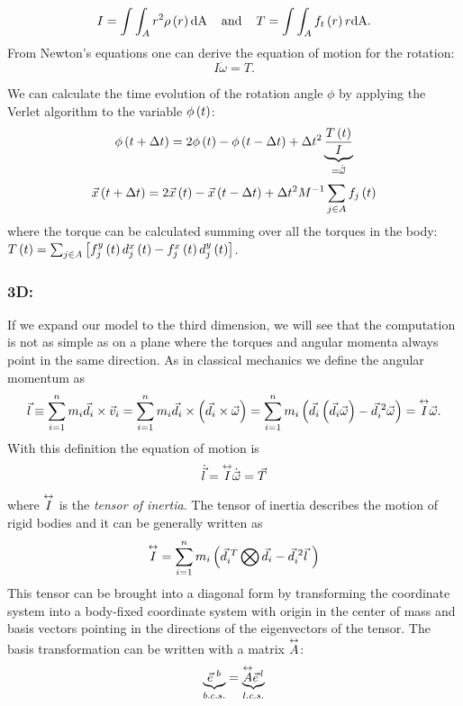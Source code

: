 $$
I = \int\int_{A}{r^2 \rho \left(r\right) \text{dA}}
\hspace{0.4cm}\text{and}\hspace{0.4cm} 
T = \int\int_{A}{f_t\left(r\right) r \text{dA}}.
\label{eq:cof_eom}
$$
From Newton's equations one can derive the equation of motion for the rotation:
\begin{equation}
I\dot{\omega} = T.
\label{eq:eom_rot}
\end{equation}

We can calculate the time evolution of the rotation angle $\phi$ by applying the Verlet algorithm to the variable $\phi\left(t\right)$:
$$
\phi\left(t+\Delta t\right) = 2 \phi\left(t\right) -\phi\left(t-\Delta t\right) + \Delta t^2 \underbrace{ \frac{T\left(t\right)}{I}}_{=\dot{\vec{\omega}}}
$$
 $$
\vec{x}\left(t+\Delta t\right) = 2 \vec{x}\left(t\right) -\vec{x}\left(t-\Delta t\right) + \Delta t^2 M^{-1} \sum_{j\in A} {f_j\left(t\right)}
 $$
 where the torque can be calculated summing over all the torques in the body: $T\left(t\right) = \sum_{j\in A} \left[    f^y_j\left(t\right) d^x_j\left(t\right) -  f^x_j\left(t\right) d^y_j\left(t\right)     \right]$. 
 

\subsubsection*{3D:}
If we expand our model to the third dimension, we will see that the computation is not as simple as on a plane where the torques and angular momenta always point in the same direction. As in classical mechanics we define the angular momentum as
$$
\vec{l} \equiv \sum_{i=1}^n{m_i\vec{d}_i \times \vec{v}_i} 
= \sum_{i=1}^n{m_i\vec{d}_i \times \left(\vec{d}_i \times \vec{\omega}\right)} 
= \sum_{i=1}^n {m_i   \left(\vec{d}_i    \left(\vec{d}_i \vec{\omega}\right)   -\vec{d}_i^{\,\,2}\vec{\omega} \right)  }     
= \overset{\leftrightarrow}{I} \vec{\omega}.
$$
With this definition the equation of motion is
$$
\dot{\vec{l}} = \overset{\leftrightarrow}{I}\dot{\vec{\omega}} = \vec{T}
$$  
where $\overset{\leftrightarrow}{I}$ is the \emph{tensor of inertia}. The tensor of inertia describes the motion of rigid bodies and it can be generally written as
$$
\overset{\leftrightarrow}{I} = \sum _{i=1}^n {m_i \left(  \vec{d}_i^{\,\,T}  \bigotimes    \vec{d}_i   -\vec{d}_i^{\,\,2} \vec{l}\,\,    \right)       }
$$
 This tensor can be brought into a diagonal form by transforming the coordinate system into a body-fixed coordinate system with origin in the center of mass and basis vectors pointing in the directions of the eigenvectors of the tensor. The basis transformation can be written with a matrix $\overset{\leftrightarrow}{A}$:
 \begin{equation}
\underbrace{ \vec{e}^{\,\,b} }_{b.c.s.}= \underbrace{ \overset{\leftrightarrow}{A}\vec{e}^{\,l} }_{l.c.s.}
\label{eq:transf_mat}
\end{equation}

